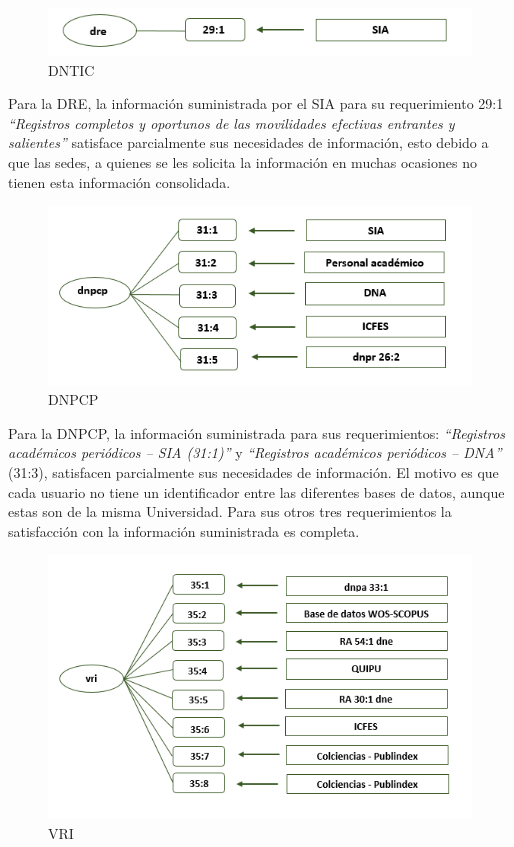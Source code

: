\documentclass[
]{book}
\begin{document}
\begin{figure}

{\centering \includegraphics[width=0.75\linewidth]{Imagenes/ima4} 

}

\caption{DNTIC}\label{fig:unnamed-chunk-32}
\end{figure}

Para la DRE, la información suministrada por el SIA para su requerimiento 29:1 \emph{``Registros completos y oportunos de las movilidades efectivas entrantes y salientes''} satisface parcialmente
sus necesidades de información, esto debido a que las sedes, a quienes se les solicita la
información en muchas ocasiones no tienen esta información consolidada.

\begin{figure}

{\centering \includegraphics[width=0.75\linewidth]{Imagenes/ima5} 

}

\caption{DNPCP}\label{fig:unnamed-chunk-33}
\end{figure}

Para la DNPCP, la información suministrada para sus requerimientos: \emph{``Registros académicos periódicos -- SIA (31:1)''} y \emph{``Registros académicos periódicos -- DNA''} (31:3), satisfacen
parcialmente sus necesidades de información. El motivo es que cada usuario no tiene un
identificador entre las diferentes bases de datos, aunque estas son de la misma Universidad. Para
sus otros tres requerimientos la satisfacción con la información suministrada es completa.

\begin{figure}

{\centering \includegraphics[width=0.75\linewidth]{Imagenes/ima6} 

}

\caption{VRI}\label{fig:unnamed-chunk-34}
\end{figure}
\end{document}
